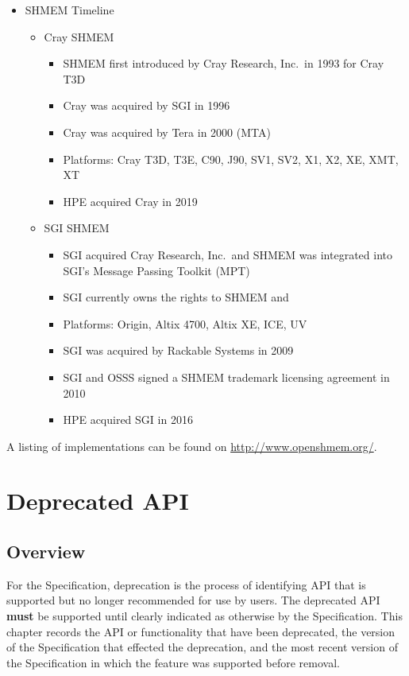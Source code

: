 \begin{itemize}
\item SHMEM Timeline
  \begin{itemize}
  \item Cray SHMEM
    \begin{itemize}
    \item SHMEM first introduced by Cray Research, Inc.\ in 1993 for Cray T3D
    \item Cray was acquired by \ac{SGI} in 1996
    \item Cray was acquired by Tera in 2000 (MTA)
    \item Platforms: Cray T3D, T3E, C90, J90, SV1, SV2, X1, X2, XE, XMT, XT
    \item \ac{HPE} acquired Cray in 2019
    \end{itemize}
  \item \ac{SGI} SHMEM
    \begin{itemize}
    \item \ac{SGI} acquired Cray Research, Inc.\ and SHMEM was integrated into
      \ac{SGI}'s Message Passing Toolkit (MPT)
    \item \ac{SGI} currently owns the rights to SHMEM and \openshmem
    \item Platforms: Origin, Altix 4700, Altix XE, ICE, UV
    \item \ac{SGI} was acquired by Rackable Systems in 2009
    \item \ac{SGI} and \ac{OSSS} signed a
      SHMEM trademark licensing agreement in 2010
    \item \ac{HPE} acquired \ac{SGI} in 2016
    \end{itemize}
  \end{itemize}
\end{itemize}

A listing of \openshmem implementations can be found on
\url{http://www.openshmem.org/}.








\chapter{Deprecated \acs{API}}\label{sec:dep}

\section{Overview}\label{dep:overview}
For the \openshmem Specification, deprecation is the process of identifying
\ac{API} that is supported but no longer recommended for use by users.
The deprecated \ac{API} \textbf{must} be supported until clearly
indicated as otherwise by the Specification.
This chapter records the \ac{API} or functionality that have been deprecated, the
version of the \openshmem Specification that effected the deprecation, and the
most recent version of the \openshmem Specification in which the feature was
supported before removal.

